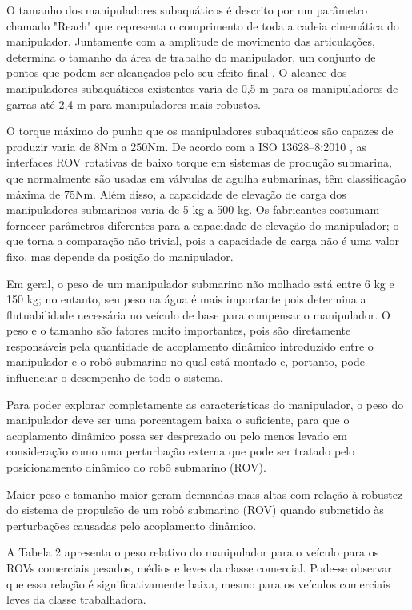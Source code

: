 O tamanho dos manipuladores subaquáticos é descrito por um parâmetro chamado "Reach" que representa o comprimento de toda a cadeia cinemática do manipulador. Juntamente com a amplitude de movimento das articulações, determina o tamanho da área de trabalho do manipulador, um conjunto de pontos que podem ser alcançados pelo seu efeito final \cite{cao2011accurate}. O alcance dos manipuladores subaquáticos existentes varia de 0,5 m para os manipuladores de garras até 2,4 m para manipuladores mais robustos.

O torque máximo do punho que os manipuladores subaquáticos são capazes de produzir varia de 8Nm a 250Nm. De acordo com a ISO 13628–8:2010 \cite{iso2010petroleum}, as interfaces ROV rotativas de baixo torque em sistemas de produção submarina, que normalmente são usadas em válvulas de agulha submarinas, têm classificação máxima de 75Nm. Além disso, a capacidade de elevação de carga dos manipuladores submarinos varia de 5 kg a 500 kg. Os fabricantes costumam fornecer parâmetros diferentes para a capacidade de elevação do manipulador; o que torna a comparação não trivial, pois a capacidade de carga não é uma valor fixo, mas depende da posição do manipulador.

Em geral, o peso de um manipulador submarino não molhado está entre 6 kg e 150 kg; no entanto, seu peso na água é mais importante pois determina a flutuabilidade necessária no veículo de base para compensar o manipulador. O peso e o tamanho são fatores muito importantes, pois são diretamente responsáveis ​​pela quantidade de acoplamento dinâmico introduzido entre o manipulador e o robô submarino no qual está montado e, portanto, pode influenciar o desempenho de todo o sistema. 

Para poder explorar completamente as características do manipulador, o peso do manipulador deve ser uma porcentagem baixa o suficiente, para que o acoplamento dinâmico possa ser desprezado ou pelo menos levado em consideração como uma perturbação externa que pode ser tratado pelo posicionamento dinâmico do robô submarino (ROV). 

Maior peso e tamanho maior geram demandas mais altas com relação à robustez do sistema de propulsão de um robô submarino (ROV) quando submetido às perturbações causadas pelo acoplamento dinâmico. 

 A Tabela 2 apresenta o peso relativo do manipulador para o veículo para os ROVs comerciais pesados, médios e leves da classe comercial. Pode-se observar que essa relação é significativamente baixa, mesmo para os veículos comerciais leves da classe trabalhadora.

